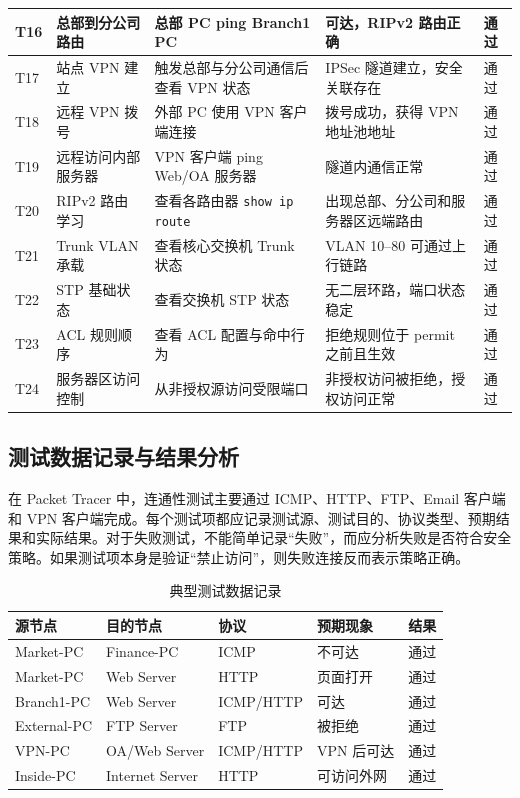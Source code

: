 \documentclass[12pt,a4paper]{ctexart}
\begin{document}
\begin{longtable}{|p{1.3cm}|p{3.1cm}|p{3.5cm}|p{3.6cm}|p{2.5cm}|}
T16 & 总部到分公司路由 & 总部 PC ping Branch1 PC & 可达，RIPv2 路由正确 & 通过 \\ \hline
T17 & 站点 VPN 建立 & 触发总部与分公司通信后查看 VPN 状态 & IPSec 隧道建立，安全关联存在 & 通过 \\ \hline
T18 & 远程 VPN 拨号 & 外部 PC 使用 VPN 客户端连接 & 拨号成功，获得 VPN 地址池地址 & 通过 \\ \hline
T19 & 远程访问内部服务器 & VPN 客户端 ping Web/OA 服务器 & 隧道内通信正常 & 通过 \\ \hline
T20 & RIPv2 路由学习 & 查看各路由器 \texttt{show ip route} & 出现总部、分公司和服务器区远端路由 & 通过 \\ \hline
T21 & Trunk VLAN 承载 & 查看核心交换机 Trunk 状态 & VLAN 10--80 可通过上行链路 & 通过 \\ \hline
T22 & STP 基础状态 & 查看交换机 STP 状态 & 无二层环路，端口状态稳定 & 通过 \\ \hline
T23 & ACL 规则顺序 & 查看 ACL 配置与命中行为 & 拒绝规则位于 permit 之前且生效 & 通过 \\ \hline
T24 & 服务器区访问控制 & 从非授权源访问受限端口 & 非授权访问被拒绝，授权访问正常 & 通过 \\ \hline
\end{longtable}

\subsection{测试数据记录与结果分析}

在 Packet Tracer 中，连通性测试主要通过 ICMP、HTTP、FTP、Email 客户端和 VPN 客户端完成。每个测试项都应记录测试源、测试目的、协议类型、预期结果和实际结果。对于失败测试，不能简单记录“失败”，而应分析失败是否符合安全策略。如果测试项本身是验证“禁止访问”，则失败连接反而表示策略正确。

\begin{table}[H]
\centering
\caption{典型测试数据记录}
\label{tab:test-data-record}
\begin{tabular}{|p{3cm}|p{3cm}|p{3cm}|p{3cm}|p{2cm}|}
\hline
\textbf{源节点} & \textbf{目的节点} & \textbf{协议} & \textbf{预期现象} & \textbf{结果} \\ \hline
Market-PC & Finance-PC & ICMP & 不可达 & 通过 \\ \hline
Market-PC & Web Server & HTTP & 页面打开 & 通过 \\ \hline
Branch1-PC & Web Server & ICMP/HTTP & 可达 & 通过 \\ \hline
External-PC & FTP Server & FTP & 被拒绝 & 通过 \\ \hline
VPN-PC & OA/Web Server & ICMP/HTTP & VPN 后可达 & 通过 \\ \hline
Inside-PC & Internet Server & HTTP & 可访问外网 & 通过 \\ \hline
\end{tabular}
\end{table}
\end{document}
